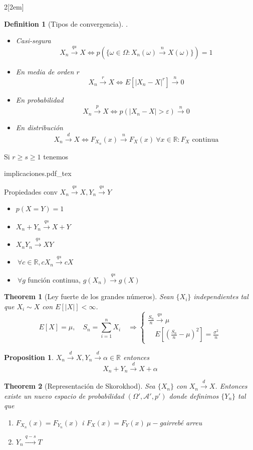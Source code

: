 \documentclass{myclass}
\newtheorem*{theorem}{Theorem}
\newtheorem*{proposition}{Proposition}
\newtheorem*{definition}{Definition}
\newcommand{\incfig}[1]{%
\begin{center}
\def\svgwidth{0.9\columnwidth}
{#1.pdf_tex}
\end{center}
}
\begin{document}
\begin{multicols}{2}[\columnsep2em]
\begin{definition}[Tipos de convergencia].
\begin{itemize}[topsep=-6pt, itemsep=0pt]
  \item Casi-segura 
	\[
	X_n \xrightarrow{qs} X \iff p(\{\omega \in \Omega : X_n(\omega ) \xrightarrow{n} X(\omega )\}) = 1
	\] 
  \item En media de orden $r$
	\[
	X_n \xrightarrow{r} X \iff E[|X_n-X|^r] \xrightarrow{n} 0
	\] 
  \item En probabilidad
	\[
   X_n \xrightarrow{p} X \iff p(|X_n-X| >\varepsilon) \xrightarrow{n} 0
	\] 
  \item En distribución 
	\[
	X_n\xrightarrow{d} X \iff F_{X_n}(x) \xrightarrow{n} F_{X}(x) \ \forall x\in \mathbb{R}: F_X  \text{ continua}
	\] 
\end{itemize}
\end{definition}
Si $r\ge s\ge 1$ tenemos
\incfig{implicaciones}

Propiedades conv $X_n \xrightarrow{qs} X, Y_n \xrightarrow{qs} Y$
\begin{itemize}[topsep=-6pt, itemsep=0pt]
  \item $p(X=Y) = 1$ 
  \item $X_n + Y_n \xrightarrow{qs} X+Y$
  \item $X_nY_n \xrightarrow{qs} XY$
  \item $\ \forall c \in \mathbb{R}, cX_n \xrightarrow{qs} cX$
  \item $\ \forall g$ función continua, $g(X_n) \xrightarrow{qs} g(X)$
\end{itemize}

\begin{theorem}[Ley fuerte de los grandes números]
Sean $\{X_i\}$ independientes tal que  $X_i \sim  X$ con $E[|X|]<\infty$.
\[
E[X] = \mu, \quad S_n = \sum_{i=1}^n X_i \quad \Rightarrow
\begin{cases}
\frac{S_n}{n} \xrightarrow{qs} \mu \\ \quad E\left[ \left( \frac{S_n}{n} - \mu \right)^2  \right] = \frac{\sigma^2}{n}
\end{cases}
\] 
\end{theorem}

\begin{proposition}
$X_n \xrightarrow{d} X, Y_n \xrightarrow{d} \alpha \in \mathbb{R} $ entonces
\[
X_n+Y_n \xrightarrow{d} X+ \alpha 
\] 
\end{proposition}

\begin{theorem}[Representación de Skorokhod] Sea $\{X_n\}$ con  $X_n \xrightarrow{d}  X$. Entonces existe un nuevo espacio de probabilidad $(\Omega ', \mathcal{A}', p')$ donde definimos $\{Y_n\}$ tal que 
   \begin{enumerate}[topsep=-6pt, itemsep=0pt]
    \item $F_{X_n}(x) = F_{Y_n}(x)$ i $F_{X}(x) = F_{Y}(x) \ \mu-$gairrebé arreu
	\item $Y_n \xrightarrow{q-s} T$
  \end{enumerate}
\end{theorem}


\end{multicols}
\end{document}
